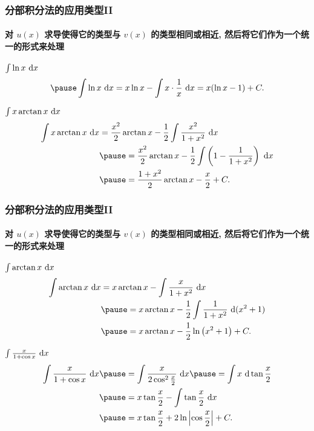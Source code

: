 \documentclass[
10pt,
aspectratio=43,
]{beamer}
\begin{document}
\begin{frame}
	\frametitle{分部积分法的应用类型II}
	\framesubtitle{对 $u(x)$ 求导使得它的类型与 $v(x)$ 的类型相同或相近, 然后将它们作为一个统一的形式来处理}
	\everymath{\displaystyle}
	\begin{exampleblock}{$\color{black}\int \ln x \mathrm{~d} x$}
		$$
			\pause \int \ln x \mathrm{~d} x=x \ln x-\int x \cdot \frac{1}{x} \mathrm{~d} x=x(\ln x-1)+C.
		$$
	\end{exampleblock}
	\pause
	\begin{exampleblock}{$\color{black}\int x \arctan x \mathrm{~d} x$}
		\pause
		$$
			\begin{aligned}
				\int x \arctan x \mathrm{~d} x & =\frac{x^2}{2} \arctan x-\frac{1}{2} \int \frac{x^2}{1+x^2} \mathrm{~d} x                    \\
				                               & \pause =\frac{x^2}{2} \arctan x-\frac{1}{2} \int\left(1-\frac{1}{1+x^2}\right) \mathrm{~d} x \\
				                               & \pause =\frac{1+x^2}{2} \arctan x-\frac{x}{2}+C.
			\end{aligned}
		$$
	\end{exampleblock}
\end{frame}

\begin{frame}
	\frametitle{分部积分法的应用类型II}
	\framesubtitle{对 $u(x)$ 求导使得它的类型与 $v(x)$ 的类型相同或相近, 然后将它们作为一个统一的形式来处理}
	\everymath{\displaystyle}
	{\small
		\begin{exampleblock}{$\color{black}\int  \arctan x \mathrm{~d} x$}
			\pause
			$$
				\begin{aligned}
					\int  \arctan x \mathrm{~d} x & =x \arctan x- \int \frac{x}{1+x^2} \mathrm{~d} x                         \\
					                              & \pause = x \arctan x-\frac{1}{2} \int\frac{1}{1+x^2} \mathrm{~d} (x^2+1) \\
					                              & \pause = x \arctan x-\frac{1}{2}\ln\left(x^2+1\right)+C.
				\end{aligned}
			$$
		\end{exampleblock}
		\begin{exampleblock}{$\color{black}\int \frac{x}{1+\cos x} \mathrm{~d} x$}
			\pause
			$$
				\begin{aligned}
					\int \frac{x}{1+\cos x} \mathrm{~d} x & \pause =\int \frac{x}{2 \cos ^2 \frac{x}{2}} \mathrm{~d} x\pause =\int x \mathrm{~d} \tan \frac{x}{2} \\
					                                      & \pause =x \tan \frac{x}{2}-\int \tan \frac{x}{2} \mathrm{~d} x                                        \\
					                                      & \pause =x \tan \frac{x}{2}+2 \ln \left|\cos \frac{x}{2}\right|+C.
				\end{aligned}
			$$
		\end{exampleblock}
	}
\end{frame}
\end{document}
